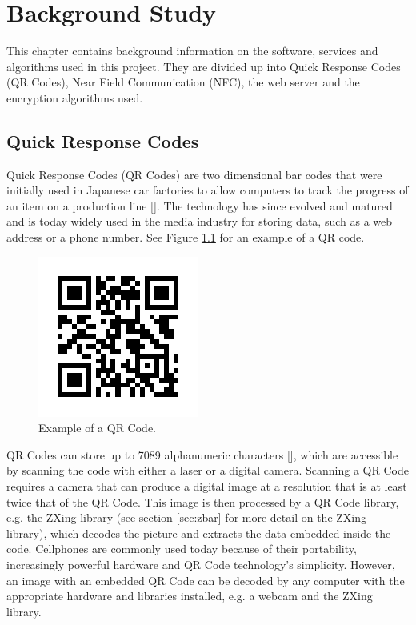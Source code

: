 \chapter{Background Study}
\label{chap:2}

This chapter contains background information on the software, services and algorithms used
in this project. They are divided up into Quick Response Codes (QR Codes), Near Field
Communication (NFC), the web server and the encryption algorithms used.

\section{Quick Response Codes}

 Quick Response Codes (QR Codes) are two dimensional bar codes that were initially
 used in Japanese car factories to allow computers to track the progress of
 an item on a production line [\cite{journal:qr-code}]. The technology has
 since evolved and matured and is today widely used in the media industry for storing
 data, such as a web address or a phone number. See Figure \ref{qrcode} for an example of
 a QR code.
 
\begin{figure}
\centering
\includegraphics[scale = 0.7]{qrcode_voorbeeld.png}
\caption{Example of a QR Code.}
\label{qrcode}
\end{figure}
 
 QR Codes can store up to 7089 alphanumeric characters [\cite{journal:qr-code}], which are
 accessible by scanning the code with either a laser or a digital camera.
 Scanning a QR Code requires a camera that can produce a digital image at a
 resolution that is at least twice that of the QR Code.
 This image is then processed by a QR Code library, e.g.
 the ZXing library (see section \ref{sec:zbar} for more detail on the ZXing library),
 which decodes the picture and extracts the data embedded inside the code. Cellphones are
 commonly used today because of their portability, increasingly powerful hardware and QR
 Code technology's simplicity.
 However, an image with an embedded QR Code can be decoded by any computer with the
 appropriate hardware and libraries installed, e.g. a webcam and the ZXing library.

